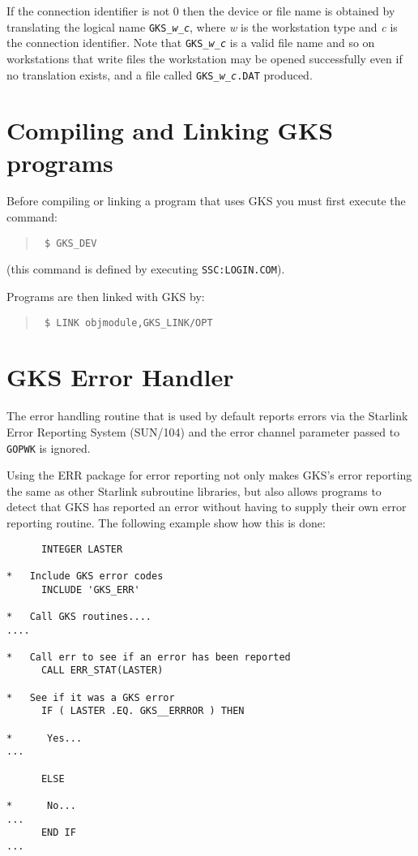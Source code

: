 If the connection identifier is not 0 then the device or file name is
obtained by translating the logical name {\tt GKS\_\em{w}\_{\em c}}, where {\em
w} is the workstation type and {\em c} is the connection identifier. Note that
{\tt GKS\_\em{w}\_{\em c}} is a valid file name and so on workstations that
write files the workstation may be opened successfully even if no translation
exists, and a file called {\tt GKS\_{\em w}\_{\em c}.DAT} produced. 

\section{Compiling and Linking GKS programs}
Before compiling or linking a program that uses GKS you must first execute the
command:
\begin{quote}\tt
\$ GKS\_DEV
\end{quote}
(this command is defined by executing {\tt SSC:LOGIN.COM}).

Programs are then linked with GKS by:
\begin{quote}\tt
\$ LINK objmodule,GKS\_LINK/OPT
\end{quote}

\section{GKS Error Handler}
The error handling routine that is used by default reports errors via the
Starlink Error Reporting System (SUN/104) and the error channel parameter
passed to {\tt GOPWK} is ignored.

Using the ERR package for error reporting not only makes GKS's error reporting
the same as other Starlink subroutine libraries, but also allows programs
to detect that GKS has reported an error without having to supply their
own error reporting routine. The following example show how this is
done:
\begin{verbatim}
      INTEGER LASTER

*   Include GKS error codes
      INCLUDE 'GKS_ERR'

*   Call GKS routines....
....

*   Call err to see if an error has been reported
      CALL ERR_STAT(LASTER)

*   See if it was a GKS error
      IF ( LASTER .EQ. GKS__ERRROR ) THEN

*      Yes...
...

      ELSE

*      No...
...
      END IF
...
\end{verbatim}

